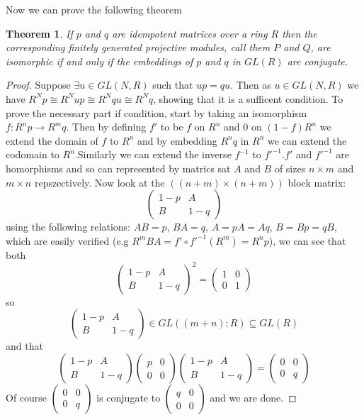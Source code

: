 \documentclass[a4paper,10pt]{article}
\newtheorem{thm}{Theorem}[subsection]
\begin{document}
Now we can prove the following theorem
\begin{thm}
	If $p$ and $q$ are idempotent matrices over a ring $R$ then the corresponding finitely generated projective modules, call them $P$ and $Q$, are isomorphic if and only if the embeddings of $p$ and $q$ in $GL(R)$ are conjugate.
\end{thm}
\begin{proof}
	Suppose $\exists u\in GL(N,R)$ such that $up=qu$. Then as $u\in GL(N,R)$ we have $R^Np\cong R^Nup\cong R^Nqu\cong R^Nq$, showing that it is a sufficent condition.
	\newline To prove the necessary part if condition, start by taking an isomorphism $f: R^{n}p\rightarrow R^{m}q$. Then by defining $f'$ to be $f$ on $R^{n}$ and $0$ on $(1-f)R^{n}$ we extend the domain of $f$ to $R^{n}$ and by embedding $R^{n}q$ in $R^{n}$ we can extend the codomain to $R^{n}$.Similarly we can extend the inverse $f^{-1}$ to $f'^{-1}$.$f'$ and $f'^{-1}$ are homorphisms and so can represented by matrics sat $A$ and $B$ of sizes $n\times m$ and $m\times n$ repszectively. Now look at the $((n+m)\times (n+m))$ block matrix:$$\left(\begin{array}{cc} 1-p & A \\ B & 1-q \end{array}\right)$$
	\newline using the following relations: $AB=p$, $BA=q$, $A=pA=Aq$, $B=Bp=qB$, which are easily verified (e.g $R^{m}BA=f'\circ f'^{-1}(R^{m})=R^{n}p$), we can see that both $$\left(\begin{array}{cc} 1-p & A \\ B & 1-q \end{array}\right)^{2}=\left(\begin{array}{cc} 1 & 0 \\ 0 & 1 \end{array}\right)$$ so $$\left(\begin{array}{cc} 1-p & A \\ B & 1-q \end{array}\right)\in GL((m+n);R)\subseteq GL(R)$$ and that
	$$\left(\begin{array}{cc} 1-p & A \\ B & 1-q \end{array}\right)\left(\begin{array}{cc} p & 0 \\ 0 & 0 \end{array}\right)\left(\begin{array}{cc} 1-p & A \\ B & 1-q \end{array}\right)=\left(\begin{array}{cc} 0 & 0 \\ 0 & q \end{array}\right)$$
	Of course $\left(\begin{array}{cc} 0 & 0 \\ 0 & q \end{array}\right)$ is conjugate to $\left(\begin{array}{cc} q & 0 \\ 0 & 0 \end{array}\right)$ and we are done.
\end{proof}
\end{document}
